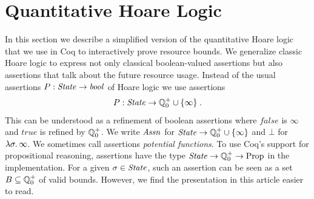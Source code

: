 \documentclass[nocopyrightspace,preprint,pldi]{sigplanconf-pldi15}
\newcommand{\ifshort}[2]{\ifx\fullversion\undefined{#1}\else{#2}\fi}
\newcommand{\sectskip}[0]{\ifshort{\vspace{-3pt}}{}}
\newcommand{\aftersectskip}[0]{\ifshort{\vspace{-1pt}}{}}
\begin{document}
\sectskip
\section{Quantitative Hoare Logic}
\label{sec:logic}
\aftersectskip

In this section we describe a simplified version of the quantitative
Hoare logic that we use in Coq to interactively prove resource bounds.
%
We generalize classic Hoare logic to express not only classical
boolean-valued assertions but also assertions that talk about the
future resource usage.  Instead of the usual assertions $P : \mathit{State}
\to \mathit{bool}$ of Hoare logic we use assertions
$$
P : \mathit{State} \to \mathbb Q^+_0 \cup \{ \infty \} \; .
$$
This can be understood as a refinement of boolean assertions where
$\mathit{false}$ is $\infty$ and $\mathit{true}$ is refined by $\mathbb Q^+_0$.
We write $\mathit{Assn}$ for $\mathit{State} \to \mathbb Q^+_0 \cup \{ \infty \}$ and $\bot$ for
$\lambda \sigma . \, \infty$.  We sometimes call assertions
\emph{potential functions}.  To use Coq's support for propositional
reasoning, assertions have the type $\mathit{State} \to \mathbb Q^+_0 \to \mathrm{Prop}$
in the implementation.  For a given $\sigma \in \mathit{State}$, such an
assertion can be seen as a set $B \subseteq \mathbb Q^+_0$ of valid bounds.
However, we find the presentation in this article easier to read.
\end{document}
